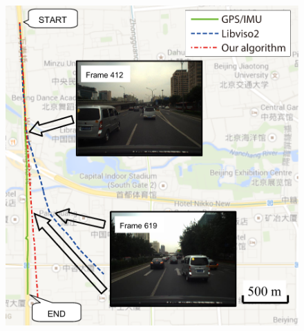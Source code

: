 \documentclass[letterpaper, 10 pt, conference]{ieeeconf}  %
\begin{document}
\begin{figure}[t]
\centering
 \begin{minipage}[t]{0.58\linewidth}
    \centering
    \includegraphics[width=1\textwidth]{source//Final//T_result_in_map_Frame200_1049.pdf}
    \label{fig:another_T_in_map}
  \end{minipage}%
  \hfill
 \begin{minipage}[t]{0.42\linewidth}
    \centering

\end{minipage}
\end{figure}
\end{document}
